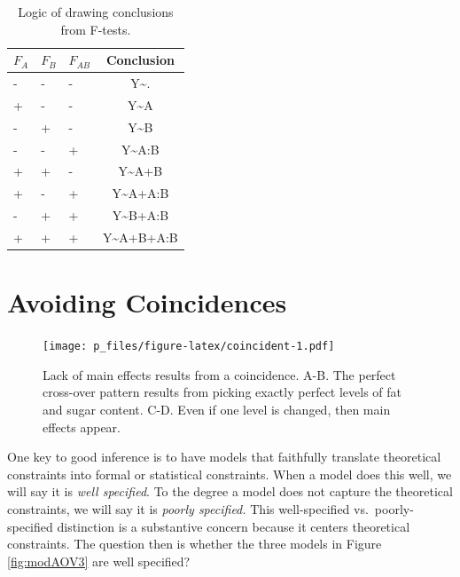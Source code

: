 \documentclass[
  english,
  ,man]{apa6}
\begin{document}
\begin{table}[tbp]

\begin{center}
\begin{threeparttable}

\caption{\label{tab:test2mod}Logic of drawing conclusions from F-tests.}

\begin{tabular}{lllc}
\toprule
$F_A$ & $F_B$ & $F_{AB}$ & Conclusion\\
\midrule
- & - & - & Y\textasciitilde{}.\\
+ & - & - & Y\textasciitilde{}A\\
- & + & - & Y\textasciitilde{}B\\
- & - & + & Y\textasciitilde{}A:B\\
+ & + & - & Y\textasciitilde{}A+B\\
+ & - & + & Y\textasciitilde{}A+A:B\\
- & + & + & Y\textasciitilde{}B+A:B\\
+ & + & + & Y\textasciitilde{}A+B+A:B\\
\bottomrule
\end{tabular}

\end{threeparttable}
\end{center}

\end{table}

\hypertarget{avoiding-coincidences}{%
\section{Avoiding Coincidences}\label{avoiding-coincidences}}

\begin{figure}
\centering
\texttt{[image: p\_files/figure-latex/coincident-1.pdf]}
\caption{\label{fig:coincident}Lack of main effects results from a coincidence. A-B. The perfect cross-over pattern results from picking exactly perfect levels of fat and sugar content. C-D. Even if one level is changed, then main effects appear.}
\end{figure}

One key to good inference is to have models that faithfully translate theoretical constraints into formal or statistical constraints. When a model does this well, we will say it is \emph{well specified}. To the degree a model does not capture the theoretical constraints, we will say it is \emph{poorly specified.} This well-specified vs.~poorly-specified distinction is a substantive concern because it centers theoretical constraints. The question then is whether the three models in Figure \ref{fig:modAOV3} are well specified?
\end{document}
